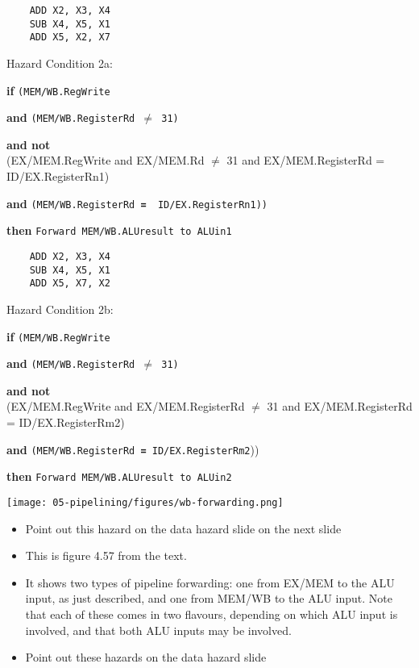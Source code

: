 \begin{frame}[fragile]
\begin{multicols}{2}
    {\tiny
\begin{verbatim}
    ADD X2, X3, X4
    SUB X4, X5, X1
    ADD X5, X2, X7
\end{verbatim}
}
{\footnotesize
 Hazard Condition 2a:

\textbf{if} {\tt ({\color{orange}MEM/WB.RegWrite }}

\textbf{and} {\tt ({\color{olive}MEM/WB.RegisterRd $\ne$ 31})}

\textbf{and not} {\color{teal}{\tt Hazard Condition 1a}}\\{\tiny {\color{gray}(EX/MEM.RegWrite and  EX/MEM.Rd $\neq$ 31 and EX/MEM.RegisterRd = ID/EX.RegisterRn1)}}

\textbf{and} {\tt ({\color{red}MEM/WB.RegisterRd} \textbf{=} {\color{blue} ID/EX.RegisterRn1}))}

\textbf{then} {\tt Forward MEM/WB.ALUresult to ALUin1}
}

\columnbreak
{\tiny
\begin{verbatim}
    ADD X2, X3, X4
    SUB X4, X5, X1
    ADD X5, X7, X2
\end{verbatim}
}
{\footnotesize
Hazard Condition 2b:

\textbf{if} {\tt ({\color{orange}MEM/WB.RegWrite }}

\textbf{and} {\tt ({\color{olive}MEM/WB.RegisterRd $\ne$ 31})}

\textbf{and not} {\color{teal}{\tt Hazard Condition 1b}}\\ {\tiny {\color{gray}(EX/MEM.RegWrite and  EX/MEM.RegisterRd $\neq$ 31 and EX/MEM.RegisterRd = ID/EX.RegisterRm2)}}

\textbf{and} {\tt ({\color{red}MEM/WB.RegisterRd} \textbf{=} \color{blue} ID/EX.RegisterRm2}))

\textbf{then} {\tt Forward MEM/WB.ALUresult to ALUin2}
}
\end{multicols}
\begin{center}
\texttt{[image: 05-pipelining/figures/wb-forwarding.png]}    
\end{center}


\BNotes\ifnum{}
\begin{itemize}
\item Point out this hazard on the data hazard slide on the next slide
\item This is figure 4.57 from the text. 
\item It shows two types of pipeline
	forwarding: one from EX/MEM to the ALU input, as just described, and
	one from MEM/WB to the ALU input. Note that each of these comes in two
	flavours, depending on which ALU input is involved, and that both ALU
	inputs may be involved.
\item Point out these hazards on the data hazard slide
\end{itemize}
\fi\ENotes
\end{frame}

